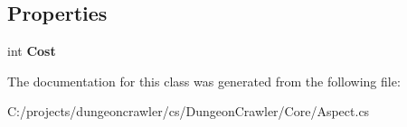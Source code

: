 \subsection*{Properties}
\begin{DoxyCompactItemize}
\item 
\hypertarget{class_dungeon_crawler_1_1_core_1_1_aspect_afef3ab7f16fca5563a025e7dcf720cc9}{}int {\bfseries Cost}\label{class_dungeon_crawler_1_1_core_1_1_aspect_afef3ab7f16fca5563a025e7dcf720cc9}

\end{DoxyCompactItemize}


The documentation for this class was generated from the following file\+:\begin{DoxyCompactItemize}
\item 
C\+:/projects/dungeoncrawler/cs/\+Dungeon\+Crawler/\+Core/Aspect.\+cs\end{DoxyCompactItemize}

